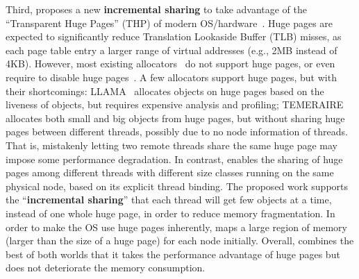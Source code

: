 
Third, \NM{} proposes a new \textbf{incremental sharing} to take advantage of the ``Transparent Huge Pages'' (THP) of modern OS/hardware~\cite{hugepage}. Huge pages are expected to significantly reduce Translation Lookaside Buffer (TLB) misses, as each page table entry  a larger range of virtual addresses (e.g., 2MB instead of 4KB). However, most existing allocators~\cite{dlmalloc, Hoard, Scalloc} do not support huge pages, or even require to disable huge pages~\cite{scallochugepage}. A few allocators support huge pages, but with their shortcomings: LLAMA~\cite{LLAMA} allocates objects on huge pages based on the liveness of objects, but requires expensive analysis and profiling;  TEMERAIRE~\cite{TEMERAIRE} allocates both small and big objects from huge pages, but without sharing huge pages between different threads, possibly due to no node information of threads. That is, mistakenly letting two remote threads share the same huge page may impose some performance degradation.  
In contrast, \NM{} enables the sharing of huge pages among different threads with different size classes running on the same physical node, based on its explicit thread binding. 
The proposed work supports the ``\textbf{incremental sharing}'' that each thread will get few objects at a time, instead of one whole huge page, in order to reduce memory fragmentation. 
In order to make the OS use huge pages inherently, \NM{} maps a large region of memory (larger than the size of a huge page) for each node initially. Overall, \NM{} combines the best of both worlds that it takes the performance advantage of huge pages but does not deteriorate the memory consumption. 


